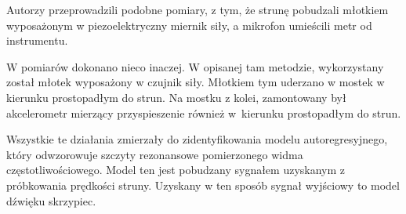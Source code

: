Autorzy \cite{bowed_4} przeprowadzili podobne pomiary, z tym, że strunę pobudzali młotkiem wyposażonym w piezoelektryczny miernik siły, a mikrofon umieścili metr od instrumentu.

W \cite{bowed_2} pomiarów dokonano nieco inaczej. W opisanej tam metodzie, wykorzystany został młotek wyposażony w czujnik siły. Młotkiem tym uderzano w mostek w kierunku prostopadłym do strun. Na mostku z kolei, zamontowany był akcelerometr mierzący przyspieszenie również w~kierunku prostopadłym do strun.

Wszystkie te działania zmierzały do zidentyfikowania modelu autoregresyjnego, który odwzorowuje szczyty rezonansowe pomierzonego widma częstotliwościowego. Model ten jest pobudzany sygnałem uzyskanym z próbkowania prędkości struny. Uzyskany w ten sposób sygnał wyjściowy to model dźwięku skrzypiec.

